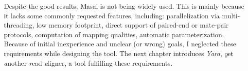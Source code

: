 Despite the good results, Masai is not being widely used.
This is mainly because it lacks some commonly requested features, including:
parallelization via multi-threading, low memory footprint, direct support of paired-end or mate-pair protocols, computation of mapping qualities, automatic parameterization.
Because of initial inexperience and unclear (or wrong) goals, I neglected these requirements while designing the tool.
The next chapter introduces \emph{Yara}, \emph{y}et \emph{a}nother \emph{r}ead \emph{a}ligner, a tool fulfilling these requirements.

